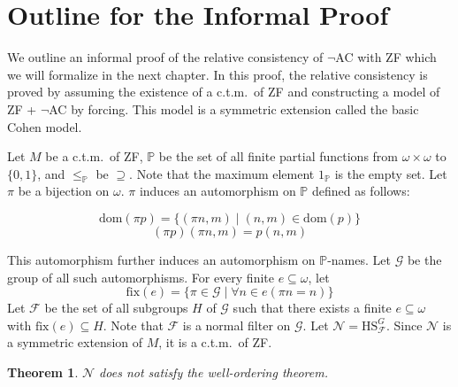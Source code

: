 \documentclass{report}
\newtheorem{thm}{Theorem}[section]
\newcommand{\Pbb}{\mathbb{P}}
\newcommand{\Gcal}{\mathcal{G}}
\newcommand{\Fcal}{\mathcal{F}}
\newcommand{\Ncal}{\mathcal{N}}
\newcommand{\ctm}{c.t.m.\ }
\begin{document}
\section{Outline for the Informal Proof}\label{sec:outline}
We outline an informal proof of the relative consistency of $\neg$AC with ZF which we will formalize in the next chapter.
In this proof, the relative consistency is proved by assuming the existence of a \ctm of ZF and constructing a model of ZF + $\neg$AC by forcing. 
This model is a symmetric extension called the basic Cohen model.

Let $M$ be a \ctm of ZF, $\Pbb$ be the set of all finite partial functions from $\omega \times \omega$ to $\{0, 1\}$, and $\leq_{\Pbb}$ be $\supseteq$.
Note that the maximum element $1_{\Pbb}$ is the empty set. 
Let $\pi$ be a bijection on $\omega$. $\pi$ induces an automorphism on $\Pbb$ defined as follows:

$$\mathrm{dom}(\pi p) = \{ (\pi n, m) \mid (n, m) \in \mathrm{dom}(p) \}$$
$$(\pi p)(\pi n, m) = p(n, m)$$

This automorphism further induces an automorphism on $\Pbb$-names. 
Let $\Gcal$ be the group of all such automorphisms.
For every finite $e \subseteq \omega$, let 
$$\mathrm{fix}(e) = \{ \pi \in \Gcal \mid \forall n \in e (\pi n = n) \}$$
Let $\Fcal$ be the set of all subgroups $H$ of $\Gcal$ such that there exists a finite $e \subseteq \omega$ with $\mathrm{fix}(e) \subseteq H$.
Note that $\Fcal$ is a normal filter on $\Gcal$. Let $\Ncal = \mathrm{HS}^{G}_{\Fcal}$.
Since $\Ncal$ is a symmetric extension of $M$, it is a \ctm of ZF. 

\begin{thm}
  $\Ncal$ does not satisfy the well-ordering theorem.
\end{thm}
\end{document}
